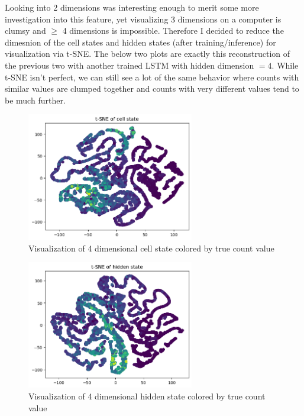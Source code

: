 \documentclass[12pt, twoside]{report}
\begin{document}
Looking into 2 dimensions was interesting enough to merit some more investigation into this feature,
yet visualizing 3 dimensions on a computer is clumsy and $\geq$ 4 dimensions is impossible.
Therefore I decided to reduce the dimesnion of the cell states and hidden states (after training/inference)
for visualization via t-SNE. The below two plots are exactly this reconstruction of the previous two 
with another trained LSTM with hidden dimension $= 4$.
While t-SNE isn't perfect, we can still see a lot of the same behavior where
counts with similar values are clumped together and counts with very different values tend to be much further.

\begin{figure}[H]
    \centering
    \includegraphics[width=0.65\textwidth]{figures/dim 4 cell state.png}
    \caption*{Visualization of 4 dimensional cell state colored by true count value}
\end{figure}

\begin{figure}[H]
    \centering
    \includegraphics[width=0.65\textwidth]{figures/dim 4 hidden state.png}
    \caption*{Visualization of 4 dimensional hidden state colored by true count value}
\end{figure}
\end{document}
